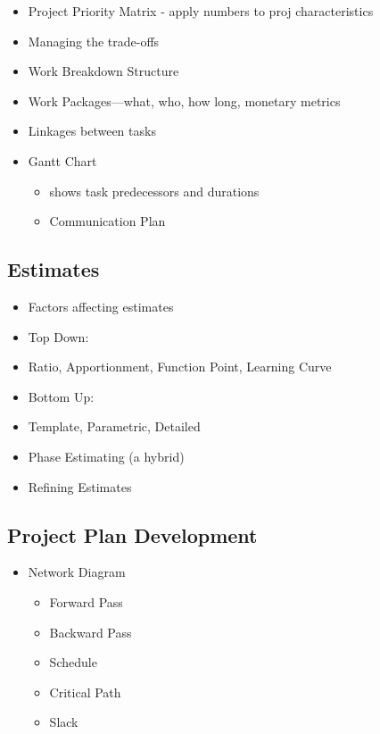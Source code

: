 \documentclass{article}[8pt]
\begin{document}
\begin{multicols}{2}
\begin{itemize}
        \item Project Priority Matrix - apply numbers to proj characteristics
        \item Managing the trade-offs
        \item Work Breakdown Structure
        \item Work Packages—what, who, how long, monetary metrics
        \item Linkages between tasks
        \item Gantt Chart
            \begin{itemize}
                \item shows task predecessors and durations
                \item Communication Plan
            \end{itemize}
    \end{itemize}

    \subsection{Estimates}
    \begin{itemize}
        \item Factors affecting estimates
        \item Top Down: 
        \item Ratio,  Apportionment,  Function Point,  Learning Curve
        \item Bottom Up:
        \item Template,  Parametric,  Detailed
        \item Phase Estimating (a hybrid) 
        \item Refining Estimates
    \end{itemize}

    \subsection{Project Plan Development}
    \begin{itemize}
        \item Network Diagram
            \begin{itemize}
                \item Forward Pass
                \item Backward Pass
                \item Schedule
                \item Critical Path
                \item Slack
            \end{itemize}
    \end{itemize}


\end{multicols}
\end{document}

